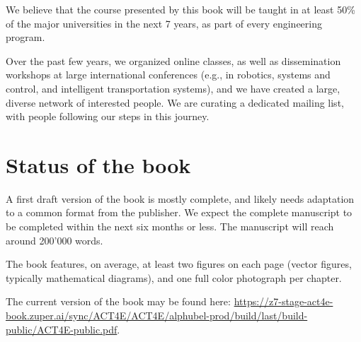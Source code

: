 \documentclass[10pt, article, one side]{memoir}
\begin{document}
    We believe that the course presented by this book will be taught in at least 50\% of the major universities in the next 7 years, as part of every engineering program.

    Over the past few years, we organized online classes, as well as dissemination workshops at large international conferences (e.g., in robotics, systems and control, and intelligent transportation systems), and we have created a large, diverse network of interested people.
    We are curating a dedicated mailing list, with people following our steps in this journey.

    \section{Status of the book}
    A first draft version of the book is mostly complete, and likely needs adaptation to a common format from the publisher.
    We expect the complete manuscript to be completed within the next six months or less.
    The manuscript will reach around 200’000 words.

    The book features, on average, at least two figures on each page (vector figures, typically mathematical diagrams), and one full color photograph per chapter.

    The current version of the book may be found here: \href{https://z7-stage-act4e-book.zuper.ai/sync/ACT4E/ACT4E/alphubel-prod/build/last/build-public/ACT4E-public.pdf}{https://z7-stage-act4e-book.zuper.ai/sync/ACT4E/ACT4E/alphubel-prod/build/last/build-public/ACT4E-public.pdf}.

\end{document}
